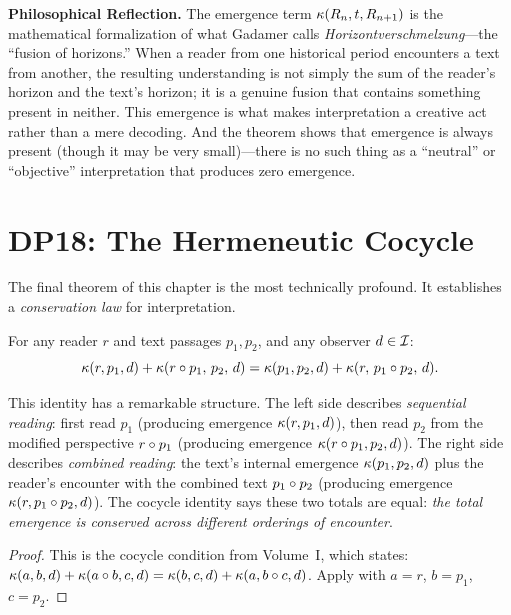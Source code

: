 \begin{reflectionbox}
\textbf{Philosophical Reflection.}
The emergence term $\kappa(R_n, t, R_{n+1})$ is the mathematical
formalization of what Gadamer calls \textit{Horizontverschmelzung}---the
``fusion of horizons.'' When a reader from one historical period
encounters a text from another, the resulting understanding is not
simply the sum of the reader's horizon and the text's horizon; it is a
genuine fusion that contains something present in neither. This
emergence is what makes interpretation a creative act rather than a
mere decoding. And the theorem shows that emergence is always present
(though it may be very small)---there is no such thing as a ``neutral''
or ``objective'' interpretation that produces zero emergence.
\end{reflectionbox}

\section{DP18: The Hermeneutic Cocycle}

The final theorem of this chapter is the most technically profound.
It establishes a \emph{conservation law} for interpretation.

\begin{theorem}
\label{thm:hermeneutic-cocycle}
For any reader $r$ and text passages $p_1, p_2$, and any observer
$d \in \mathcal{I}$:
\[
\kappa(r, p_1, d) + \kappa(r \circ p_1,\, p_2,\, d) =
\kappa(p_1, p_2, d) + \kappa(r,\, p_1 \circ p_2,\, d).
\]
\end{theorem}

This identity has a remarkable structure. The left side describes
\emph{sequential reading}: first read $p_1$ (producing emergence
$\kappa(r, p_1, d)$), then read $p_2$ from the modified perspective
$r \circ p_1$ (producing emergence
$\kappa(r \circ p_1, p_2, d)$). The right side describes
\emph{combined reading}: the text's internal emergence
$\kappa(p_1, p_2, d)$ plus the reader's encounter with the combined
text $p_1 \circ p_2$ (producing emergence
$\kappa(r, p_1 \circ p_2, d)$). The cocycle identity says these
two totals are equal: \emph{the total emergence is conserved across
different orderings of encounter}.

\begin{proof}
This is the cocycle condition from Volume~I, which states:
$\kappa(a, b, d) + \kappa(a \circ b, c, d) =
\kappa(b, c, d) + \kappa(a, b \circ c, d)$.
Apply with $a = r$, $b = p_1$, $c = p_2$.
\end{proof}

